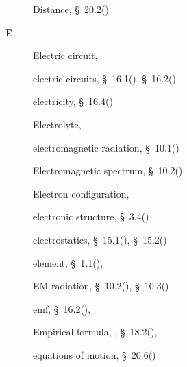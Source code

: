 \begin{multicols}{2}
{\begin{description}
	  \item[] \noindent\raggedright Distance,  \S~20.2(\pageref{m38788})
	  \vspace{.3cm}
	  \item[{\large \bfseries E}]\noindent\raggedright
	  Electric circuit,  \pageref{id2477990}
	  
	  \item[] \noindent\raggedright electric circuits,  \S~16.1(\pageref{m38771}),  \S~16.2(\pageref{m38772})
	  
	  \item[] \noindent\raggedright electricity,  \S~16.4(\pageref{m38776})
	  
	  \item[] \noindent\raggedright Electrolyte,  \pageref{id2491564}
	  
	  \item[] \noindent\raggedright electromagnetic radiation,  \S~10.1(\pageref{m38777})
	  
	  \item[] \noindent\raggedright Electromagnetic spectrum,  \S~10.2(\pageref{m38778})
	  
	  \item[] \noindent\raggedright Electron configuration,  \pageref{id2420737}
	  
	  \item[] \noindent\raggedright electronic structure,  \S~3.4(\pageref{m38741})
	  
	  \item[] \noindent\raggedright electrostatics,  \S~15.1(\pageref{m38780}),  \S~15.2(\pageref{m38781})
	  
	  \item[] \noindent\raggedright element,  \S~1.1(\pageref{m38708}),  \pageref{id2406278}
	  
	  \item[] \noindent\raggedright EM radiation,  \S~10.2(\pageref{m38778}),  \S~10.3(\pageref{m38779})
	  
	  \item[] \noindent\raggedright emf,  \S~16.2(\pageref{m38772}),  \pageref{id2479864}
	  
	  \item[] \noindent\raggedright Empirical formula,  \pageref{id2456770},  \S~18.2(\pageref{m38712}),  \pageref{id2501853}
	  
	  \item[] \noindent\raggedright equations of motion,  \S~20.6(\pageref{m38796})
	  

\end{description}}
\end{multicols}
